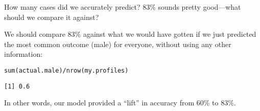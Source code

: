 \documentclass{beamer}\usepackage[]{graphicx}\usepackage[]{color}
\makeatletter
\newcommand{\hlnum}[1]{\textcolor[rgb]{0.824,0.412,0.118}{#1}}%
\newcommand{\hlstr}[1]{\textcolor[rgb]{1,0.894,0.71}{#1}}%
\newcommand{\hlopt}[1]{\textcolor[rgb]{1,0.894,0.769}{#1}}%
\newcommand{\hlstd}[1]{\textcolor[rgb]{1,0.894,0.769}{#1}}%
\newcommand{\hlkwb}[1]{\textcolor[rgb]{0.804,0.776,0.451}{#1}}%
\newcommand{\hlkwc}[1]{\textcolor[rgb]{0.78,0.941,0.545}{#1}}%
\newcommand{\hlkwd}[1]{\textcolor[rgb]{1,0.78,0.769}{#1}}%
\newenvironment{kframe}{%
 \def\at@end@of@kframe{}%
 \ifinner\ifhmode%
  \def\at@end@of@kframe{\end{minipage}}%
  \begin{minipage}{\columnwidth}%
 \fi\fi%
 \def\FrameCommand##1{\hskip\@totalleftmargin \hskip-\fboxsep
 \colorbox{shadecolor}{##1}\hskip-\fboxsep
     \hskip-\linewidth \hskip-\@totalleftmargin \hskip\columnwidth}%
 \MakeFramed {\advance\hsize-\width
   \@totalleftmargin\z@ \linewidth\hsize
   \@setminipage}}%
 {\par\unskip\endMakeFramed%
 \at@end@of@kframe}
\newenvironment{knitrout}{}{} %
\makeatother
\begin{document}
\begin{darkframes}

    \begin{frame}[fragile]{How many cases did we accurately predict?}
      83\% sounds pretty good---what should we compare it against?

      \bigskip
      \pause

      We should compare 83\% against what we would have gotten if we just predicted the most common outcome (male) for everyone, without using any other information:
      \pause

\begin{knitrout}
\begin{kframe}
\begin{alltt}
\hlkwd{sum}\hlstd{(actual.male)} \hlopt{/} \hlkwd{nrow}\hlstd{(my.profiles)}
\end{alltt}
\begin{verbatim}
[1] 0.6
\end{verbatim}
\end{kframe}
\end{knitrout}

      \pause

      In other words, our model provided a ``lift'' in accuracy from 60\% to 83\%.
    \end{frame}


\end{darkframes}
\end{document}
